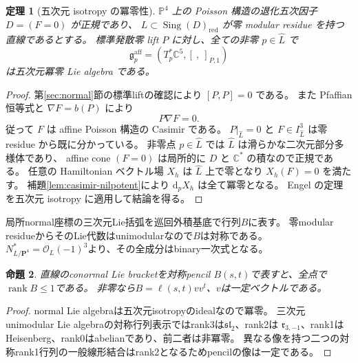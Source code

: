 \documentclass[11pt,a4paper]{ltjsarticle}
\newcommand{\PP}{\mathbf P}\renewcommand{\AA}{\mathbf A}
\newcommand{\OO}{\mathcal O}\newcommand{\FF}{\mathcal F}
\DeclareMathOperator{\rank}{rank}\DeclareMathOperator{\tr}{tr}
\newtheorem{theorem}{定理}[section]
\newtheorem{proposition}[theorem]{命題}
\theoremstyle{remark}\newtheorem{remark}[theorem]{注意}
\begin{document}
\begin{theorem}[五次元 isotropy の冪零性]
\label{thm:affine-nilpotent}
$\mathbb P^4$ 上の Poisson 構造の退化五次因子 $D=(F=0)$ が正規であり、
$L\subset\operatorname{Sing}(D)_{\mathrm{red}}$ が零 modular residue を持つ直線であるとする。
標準発散零 lift $P$ に対し、全ての非零 $p\in\widehat L$ で
\[
                 \mathfrak g^{\mathrm{aff}}_p
                   =(T_p^*\mathbb C^5,[\ ,\ ]_{P,1})
\]
は五次元冪零 Lie algebra である。
\end{theorem}
\begin{proof}
第\ref{sec:normal}節の標準liftの確認により $[P,P]=0$ である。
また Pfaffian 恒等式と $\nabla F=b(P)$ により
\[
                              P\nabla F=0.
\]
従って $F$ は affine Poisson 構造の Casimir である。
$P|_{\widehat L}=0$ と $F\in I_{\widehat L}^3$ は零 residue から既に分かっている。
非零点 $p\in\widehat L$ では $\widehat L$ は滑らかな二次元部分多様体であり、
affine cone $(F=0)$ は局所的に $D$ と $\mathbb C^*$ の積なので正規である。
任意の Hamiltonian ベクトル場 $X_h$ は $\widehat L$ 上で零となり $X_h(F)=0$ を満たす。
補題\ref{lem:casimir-nilpotent}により $\mathrm d_pX_h$ は全て冪零となる。
Engel の定理\cite{EtingofEngel}を五次元 isotropy に適用して結論を得る。
\end{proof}



局所normal座標の三次元Lie括弧を巡回外積基底で行列$B$に表す。
零modular residueからそのLie代数はunimodularなので$B$は対称である。
$N^*_{L/\PP^4}=\OO_L(-1)^3$より、その全成分はbinary一次式となる。
\begin{proposition}\label{prop:normal-bracket-rank}
直線のconormal Lie bracketを対称pencil $B(s,t)$で表すと、全点で$\rank B\le1$である。
非零なら$B=\ell(s,t)vv^t$、$v$は一定ベクトルである。
\end{proposition}
\begin{proof}
normal Lie algebraは五次元isotropyのidealなので冪零。
三次元unimodular Lie algebraの対称行列表示ではrank3は$\mathfrak{sl}_2$、rank2は
$\mathfrak r_{3,-1}$、rank1はHeisenberg、rank0はabelianであり、前二者は非冪零。
異なる像を持つ二つの対称rank1行列の一般線形結合はrank2となるためpencilの像は一定である。
\end{proof}
\end{document}
